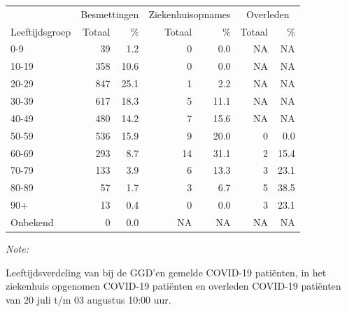 \documentclass[
  english,
  man,floatsintext]{apa6}
\begin{document}
\begin{table}[H]
\centering\begingroup\fontsize{11}{13}\selectfont

\begin{threeparttable}
\begin{tabular}{lrrrrrr}
\toprule
\multicolumn{1}{c}{ } & \multicolumn{2}{c}{Besmettingen} & \multicolumn{2}{c}{Ziekenhuisopnames} & \multicolumn{2}{c}{Overleden} \\
\cmidrule(l{3pt}r{3pt}){2-3} \cmidrule(l{3pt}r{3pt}){4-5} \cmidrule(l{3pt}r{3pt}){6-7}
Leeftijdsgroep & Totaal & \% & Totaal & \% & Totaal & \%\\
\midrule
0-9 & 39 & 1.2 & 0 & 0.0 & NA & NA\\
10-19 & 358 & 10.6 & 0 & 0.0 & NA & NA\\
20-29 & 847 & 25.1 & 1 & 2.2 & NA & NA\\
30-39 & 617 & 18.3 & 5 & 11.1 & NA & NA\\
40-49 & 480 & 14.2 & 7 & 15.6 & NA & NA\\
50-59 & 536 & 15.9 & 9 & 20.0 & 0 & 0.0\\
60-69 & 293 & 8.7 & 14 & 31.1 & 2 & 15.4\\
70-79 & 133 & 3.9 & 6 & 13.3 & 3 & 23.1\\
80-89 & 57 & 1.7 & 3 & 6.7 & 5 & 38.5\\
90+ & 13 & 0.4 & 0 & 0.0 & 3 & 23.1\\
Onbekend & 0 & 0.0 & NA & NA & NA & NA\\
\bottomrule
\end{tabular}
\begin{tablenotes}
\item \textit{Note: } 
\item Leeftijdsverdeling van bij de GGD’en gemelde COVID-19 patiënten, in het ziekenhuis opgenomen COVID-19 patiënten en overleden COVID-19 patiënten van 20 juli t/m 03 augustus 10:00 uur.
\end{tablenotes}
\end{threeparttable}
\endgroup{}
\end{table}
\end{document}
